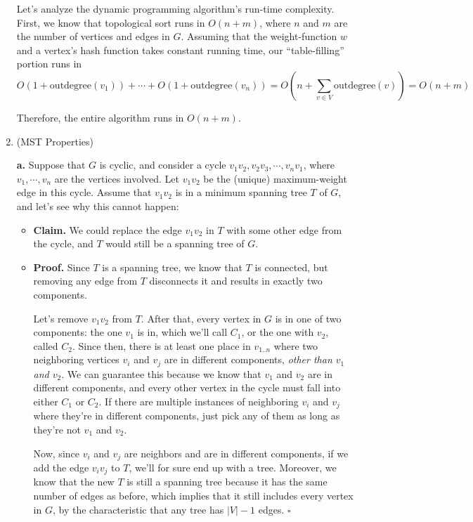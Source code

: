 \documentclass{article}
\begin{document}
\begin{enumerate}
    Let's analyze the dynamic programming algorithm's run-time complexity. First, we know that topological sort runs in $O(n + m)$, where $n$ and $m$ are the number of vertices and edges in $G$. Assuming that the weight-function $w$ and a vertex's hash function takes constant running time, our ``table-filling'' portion runs in
    $$
      O(1 + \text{outdegree}(v_1)) + \cdots + O(1 + \text{outdegree}(v_n)) = O(n + \sum_{v \in V}\text{outdegree}(v)) = O(n + m)
    $$

    Therefore, the entire algorithm runs in $O(n + m)$.

    \pagebreak

  \item (MST Properties)

    \textbf{a.} Suppose that $G$ is cyclic, and consider a cycle $v_1v_2, v_2v_3, \cdots, v_nv_1$, where $v_1, \cdots, v_n$ are the vertices involved. Let $v_1v_2$ be the (unique) maximum-weight edge in this cycle. Assume that $v_1v_2$ is in a minimum spanning tree $T$ of $G$, and let's see why this cannot happen:
    \begin{itemize}
      \item \textbf{Claim.} We could replace the edge $v_1v_2$ in $T$ with some other edge from the cycle, and $T$ would still be a spanning tree of $G$.
      \item \textbf{Proof.} Since $T$ is a spanning tree, we know that $T$ is connected, but removing any edge from $T$ disconnects it and results in exactly two components.

        Let's remove $v_1v_2$ from $T$. After that, every vertex in $G$ is in one of two components: the one $v_1$ is in, which we'll call $C_1$, or the one with $v_2$, called $C_2$. Since then, there is at least one place in $v_{1..n}$ where two neighboring vertices $v_i$ and $v_j$ are in different components, \textit{other than $v_1$ and $v_2$}. We can guarantee this because we know that $v_1$ and $v_2$ are in different components, and every other vertex in the cycle must fall into either $C_1$ or $C_2$. If there are multiple instances of neighboring $v_i$ and $v_j$ where they're in different components, just pick any of them as long as they're not $v_1$ and $v_2$.

        Now, since $v_i$ and $v_j$ are neighbors and are in different components, if we add the edge $v_iv_j$ to $T$, we'll for sure end up with a tree. Moreover, we know that the new $T$ is still a spanning tree because it has the same number of edges as before, which implies that it still includes every vertex in $G$, by the characteristic that any tree has $|V| - 1$ edges. $\square$
    \end{itemize}


\end{enumerate}
\end{document}
